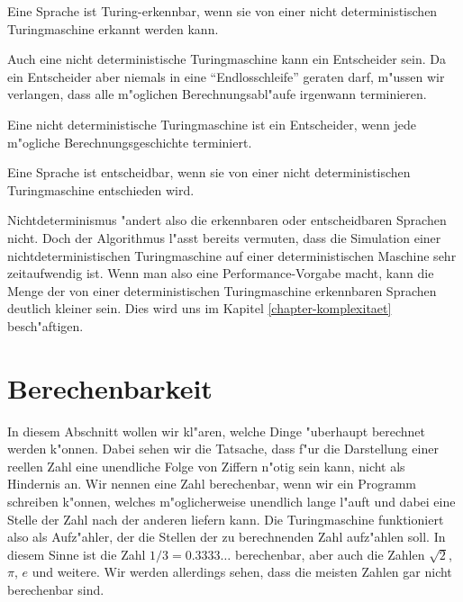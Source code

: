 \begin{satz}
Eine Sprache ist Turing-erkennbar, wenn sie von einer nicht deterministischen
Turingmaschine erkannt werden kann.
\end{satz}

Auch eine nicht deterministische Turingmaschine kann ein Entscheider sein.
Da ein Entscheider aber niemals in eine ``Endlosschleife'' geraten darf,
m"ussen wir verlangen, dass alle m"oglichen Berechnungsabl"aufe
irgenwann terminieren.

\begin{definition}
Eine nicht deterministische Turingmaschine ist ein Entscheider, wenn
jede m"ogliche Berechnungsgeschichte terminiert.
\end{definition}

\begin{satz}
Eine Sprache ist entscheidbar, wenn sie von einer nicht deterministischen
Turingmaschine entschieden wird.
\end{satz}

Nichtdeterminismus "andert also die erkennbaren oder entscheidbaren Sprachen
nicht. Doch der Algorithmus l"asst bereits vermuten, dass die Simulation
einer nichtdeterministischen Turingmaschine auf einer deterministischen
Maschine sehr zeitaufwendig ist. Wenn man also eine Performance-Vorgabe
macht, kann die Menge der von einer deterministischen Turingmaschine
erkennbaren Sprachen deutlich kleiner sein. Dies wird uns im Kapitel
\ref{chapter-komplexitaet} besch"aftigen.

\section{Berechenbarkeit}
In diesem Abschnitt wollen wir kl"aren, welche Dinge "uberhaupt
berechnet werden k"onnen. Dabei sehen wir die Tatsache, dass f"ur
die Darstellung einer reellen Zahl eine unendliche Folge von Ziffern
n"otig sein kann, nicht als Hindernis an. Wir nennen eine Zahl
berechenbar, wenn wir ein Programm schreiben k"onnen, welches
m"oglicherweise unendlich lange l"auft und dabei eine Stelle der
Zahl nach der anderen liefern kann. Die Turingmaschine
funktioniert also als Aufz"ahler, der die Stellen der zu berechnenden
Zahl aufz"ahlen soll.  In diesem Sinne ist die
Zahl $1/3=0.3333\dots$ berechenbar, aber auch die Zahlen $\sqrt{2}$, $\pi$,
$e$ und weitere. Wir werden allerdings sehen, dass die meisten
Zahlen gar nicht berechenbar sind.

